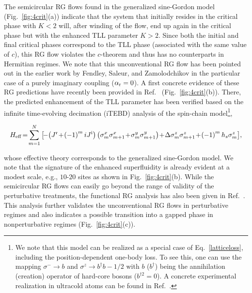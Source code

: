 \documentclass{tADP2e}
\theoremstyle{plain}
\newcommand{\eqn}[1]{
\begin{eqnarray}
	#1
\end{eqnarray}
}
\theoremstyle{plain}
\theoremstyle{definition}
\begin{document}
The semicircular RG flows found in the generalized sine-Gordon model (Fig.~\ref{fig:4crit}(a)) indicate that the system that initially resides in the critical phase with $K<2$ will, after winding of the flow, end up again in the critical phase but with the enhanced TLL parameter $K>2$.  Since both the initial and final critical phases correspond to the TLL phase (associated with the same value of $c$), this RG flow violates the $c$-theorem and thus has no counterparts in Hermitian regimes. We note that this unconventional RG flow has been pointed out in the earlier work by Fendley, Saleur, and Zamolodchikov \cite{FP93} in the particular case of a purely imaginary coupling ($\alpha_{\rm r}=0$). A first concrete evidence of these  RG predictions have recently been provided in Ref.~\cite{YA17nc} (Fig.~\ref{fig:4crit}(b)). There, the predicted enhancement of the TLL parameter has been verified based on the infinite time-evolving decimation (iTEBD) {\cite{GV07}} analysis of the spin-chain model\footnote{We note that this model can be realized as a special case of Eq.~\eqref{latticeloss}, including the position-dependent one-body loss. To see this, one can use the mapping $\sigma^-\to b$ and $\sigma^z\to b^\dagger b-1/2$ with $b$ ($b^\dagger$) being the annihilation  (creation) operator of hard-core bosons ($b^{\dagger 2}=0$). A concrete experimental realization in ultracold atoms can be found in Ref.~\cite{YA17nc}.}, 
\eqn{H_{{\rm eff}}\!=\!\sum_{m=1}^{N}\left[\!-\!\left(J^{\rm r}\!+\!\left(-1\right)^{m}iJ^{\rm i}\right)\left(\sigma_{m}^{x}\sigma_{m+1}^{x}\!+\!\sigma_{m}^{y}\sigma_{m+1}^{y}\right)\!+\!\Delta\sigma_{m}^{z}\sigma_{m+1}^{z}\!+\!\left(-1\right)^{m}h_{s}\sigma_{m}^{z}\right]\!,}
whose effective theory corresponds to the generalized sine-Gordon model. We note that the signature of the enhanced superfluidity is already evident at a modest scale, e.g., $10$-$20$ sites as shown in Fig.~\ref{fig:4crit}(b).
While the semicircular RG flows can easily go beyond the range of validity of the perturbative treatments, the functional RG analysis has also been given in Ref.~\cite{YAbook}. This analysis further validates the unconventional RG flows in perturbative regimes and also indicates a possible transition into a gapped phase in nonperturbative regimes  (Fig.~\ref{fig:4crit}(c)). 
\end{document}
